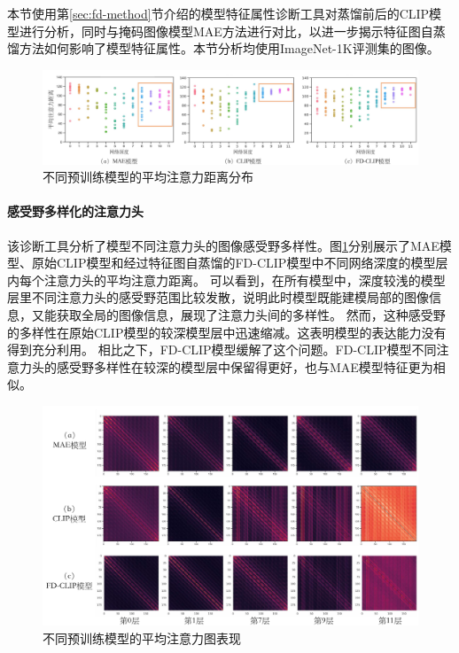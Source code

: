 本节使用第\ref{sec:fd-method}节介绍的模型特征属性诊断工具对蒸馏前后的CLIP模型进行分析，同时与掩码图像模型MAE方法进行对比，以进一步揭示特征图自蒸馏方法如何影响了模型特征属性。本节分析均使用ImageNet-1K评测集的图像。
\begin{figure}
  \centering
  \includegraphics[width=1.0\linewidth]{figures/fd-attn-distance.pdf}
  \caption{不同预训练模型的平均注意力距离分布}
  \label{fig:fd-attn-distance}
\end{figure}
\paragraph{感受野多样化的注意力头} 该诊断工具分析了模型不同注意力头的图像感受野多样性。图\ref{fig:fd-attn-distance}分别展示了MAE模型、原始CLIP模型和经过特征图自蒸馏的FD-CLIP模型中不同网络深度的模型层内每个注意力头的平均注意力距离。
可以看到，在所有模型中，深度较浅的模型层里不同注意力头的感受野范围比较发散，说明此时模型既能建模局部的图像信息，又能获取全局的图像信息，展现了注意力头间的多样性。
然而，这种感受野的多样性在原始CLIP模型的较深模型层中迅速缩减。这表明模型的表达能力没有得到充分利用\cite{xie2023revealing}。
相比之下，FD-CLIP模型缓解了这个问题。FD-CLIP模型不同注意力头的感受野多样性在较深的模型层中保留得更好，也与MAE模型特征更为相似。%

\begin{figure}
  \centering
  \includegraphics[width=1.0\linewidth]{figures/fd-attn-map.pdf}
  \caption{不同预训练模型的平均注意力图表现}
  \label{fig:fd-attn-map}
\end{figure}

